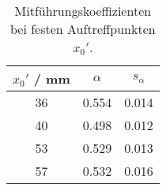 \begin{table}[H]
\caption{Mitf\"uhrungskoeffizienten bei festen Auftreffpunkten $x_0'$. }
\begin{center}
\begin{tabular}{|c|c|c|}
  \hline
  $x_0'$ / mm & $\alpha$ & $s_{\alpha}$ \\ \hline
  36 & 0.554 & 0.014 \\ \hline
  40 & 0.498 & 0.012 \\ \hline
  53 & 0.529 & 0.013 \\ \hline
  57 & 0.532 & 0.016 \\ \hline
\end{tabular}
\end{center}
\label{tab:T:alpha}
\end{table}
